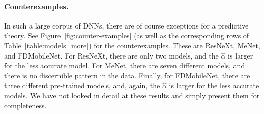 {\paragraph{Counterexamples.}
In such a large corpus of DNNs, there are of course exceptions for a predictive theory.
See
Figure~\ref{fig:counter-examples}
(as well as the corresponding rows of Table~\ref{table:models_more})
for the counterexamples.
These are ResNeXt, MeNet, and FDMobileNet.
For ResNeXt, there are only two models, and the $\hat{\alpha}$ is larger
for the less accurate model. 
For MeNet, there are seven different models,
and there is no discernible pattern in the data. 
Finally, for FDMobileNet,
there are three different pre-trained models, and, again, the 
$\hat{\alpha}$ is larger for the less accurate models. 
We have not looked in detail at these results and simply present them for completeness. 
 
}
